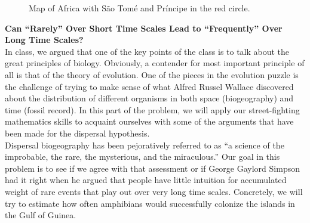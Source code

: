 \begin{figure}[h!]
	\caption{Map of Africa with S\~ao Tom\'e and Pr\'incipe in the red circle.}
	\label{fig:africa}
\end{figure}

{\bf{Can ``Rarely'' Over Short Time Scales Lead to ``Frequently'' Over Long Time
Scales?}}\\

In class, we argued that one of the key points of the class is to talk about the
great principles of biology. Obviously, a contender for most important principle
of all is that of the theory of evolution. One of the pieces in the evolution
puzzle is the challenge of trying to make sense of what Alfred Russel Wallace
discovered about the distribution of different organisms in both space
(biogeography) and time (fossil record). In this part of the problem, we will
apply our street-fighting mathematics skills to acquaint ourselves with some of
the arguments that have been made for the dispersal hypothesis.\\

Dispersal biogeography has been pejoratively referred to as ``a science of the
improbable, the rare, the mysterious, and the miraculous.'' Our goal in this
problem is to see if we agree with that assessment or if George Gaylord Simpson
had it right when he argued that people have little intuition for accumulated
weight of rare events that play out over very long time scales. Concretely, we
will try to estimate how often amphibians would successfully colonize the
islands in the Gulf of Guinea.\\


